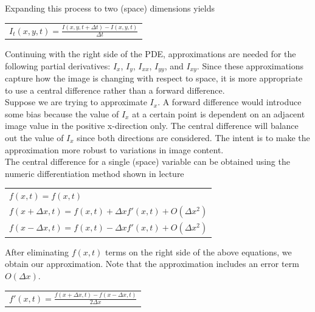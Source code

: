 \documentclass{article}
\begin{document}
  \noindent
  Expanding this process to two (space) dimensions yields
  \begin{center}
    \begin{tabular}{l}
      $I_{t}(x,y,t) = \frac{I(x,y,t+\Delta t) - I(x,y,t)}{\Delta t}$\\
    \end{tabular}
  \end{center}
  \vspace{12pt}

  \noindent
  Continuing with the right side of the PDE, approximations are needed for the following partial
  derivatives: $I_{x}$, $I_{y}$, $I_{xx}$, $I_{yy}$, and $I_{xy}$. Since these approximations
  capture how the image is changing with respect to space, it is more appropriate to use a
  central difference rather than a forward difference.\\
  
  \noindent
  Suppose we are trying to approximate
  $I_{x}$. A forward difference would introduce some bias because the value of $I_{x}$ at
  a certain point is dependent on an adjacent image value in the positive x-direction only.
  The central difference will balance out the value of $I_{x}$ since both directions
  are considered. The intent is to make the approximation more robust to variations in image content. \\

  \newpage
  \noindent
  The central difference for a single (space) variable can be obtained using the
  numeric differentiation method shown in lecture
  \begin{center}
    \begin{tabular}{l}
      \vspace{12pt}
      $f(x,t) = f(x,t)$\\
      \vspace{12pt}
      $f(x+\Delta x,t) = f(x,t) + \Delta x f'(x,t) + O(\Delta x^2)$\\
      \vspace{12pt}
      $f(x-\Delta x,t) = f(x,t) - \Delta x f'(x,t) + O(\Delta x^2)$\\
    \end{tabular}
  \end{center}

  \noindent
  After eliminating $f(x,t)$ terms on the right side of the above equations,
  we obtain our approximation. Note that the approximation includes an error term $O(\Delta x)$.
  \begin{center}
    \begin{tabular}{l}
      \vspace{12pt}
      $f'(x,t) = \frac{f(x+\Delta x,t) - f(x-\Delta x,t)}{2\Delta x}$\\
    \end{tabular}
  \end{center}
\end{document}
